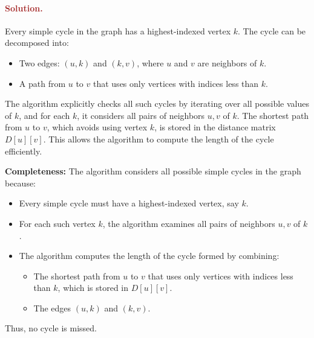\paragraph{\textcolor{brown}{Solution.}}
Every simple cycle in the graph has a highest-indexed vertex \( k \). The cycle can be decomposed into:
\begin{itemize}
    \item Two edges: \( (u, k) \) and \( (k, v) \), where \( u \) and \( v \) are neighbors of \( k \).
    \item A path from \( u \) to \( v \) that uses only vertices with indices less than \( k \).
\end{itemize}
The algorithm explicitly checks all such cycles by iterating over all possible values of \( k \), and for each \( k \), it considers all pairs of neighbors \( u, v \) of \( k \). The shortest path from \( u \) to \( v \), which avoids using vertex \( k \), is stored in the distance matrix \( D[u][v] \). This allows the algorithm to compute the length of the cycle efficiently.

\textbf{Completeness:} The algorithm considers all possible simple cycles in the graph because:
\begin{itemize}
    \item Every simple cycle must have a highest-indexed vertex, say \( k \).
    \item For each such vertex \( k \), the algorithm examines all pairs of neighbors \( u, v \) of \( k \).
    \item The algorithm computes the length of the cycle formed by combining:
    \begin{itemize}
        \item The shortest path from \( u \) to \( v \) that uses only vertices with indices less than \( k \), which is stored in \( D[u][v] \).
        \item The edges \( (u, k) \) and \( (k, v) \).
    \end{itemize}
\end{itemize}
Thus, no cycle is missed.

